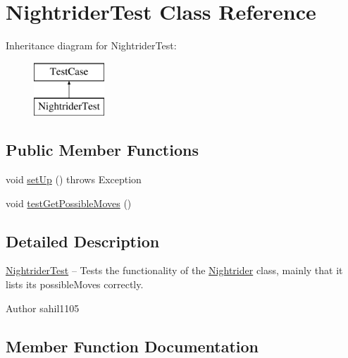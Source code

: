 \hypertarget{class_nightrider_test}{}\section{Nightrider\+Test Class Reference}
\label{class_nightrider_test}
Inheritance diagram for Nightrider\+Test\+:\begin{figure}[H]
\begin{center}
\leavevmode
\includegraphics[height=2.000000cm]{class_nightrider_test}
\end{center}
\end{figure}
\subsection*{Public Member Functions}
\begin{DoxyCompactItemize}
\item 
void \mbox{\hyperlink{class_nightrider_test_a1e89ce4af36204b171bb625747b5ee57}{set\+Up}} ()  throws Exception 
\item 
void \mbox{\hyperlink{class_nightrider_test_ae731ba66c3dcd5f17641cab9f6838d1f}{test\+Get\+Possible\+Moves}} ()
\end{DoxyCompactItemize}


\subsection{Detailed Description}
\mbox{\hyperlink{class_nightrider_test}{Nightrider\+Test}} -- Tests the functionality of the \mbox{\hyperlink{class_nightrider}{Nightrider}} class, mainly that it lists its possible\+Moves correctly. \begin{DoxyAuthor}{Author}
sahil1105 
\end{DoxyAuthor}


\subsection{Member Function Documentation}
\mbox{\label{class_nightrider_test_a1e89ce4af36204b171bb625747b5ee57}} 
